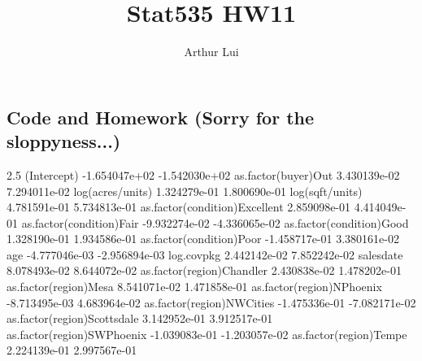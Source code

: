 \documentclass{article}
\begin{document}
\title{Stat535 HW11}
\author{Arthur Lui}
\maketitle

\subsection*{Code and Homework (Sorry for the sloppyness...)}

\begin{center}
\begin{Schunk}
\begin{Soutput}
                                      2.5 %        97.5 %
(Intercept)                   -1.654047e+02 -1.542030e+02
as.factor(buyer)Out            3.430139e-02  7.294011e-02
log(acres/units)               1.324279e-01  1.800690e-01
log(sqft/units)                4.781591e-01  5.734813e-01
as.factor(condition)Excellent  2.859098e-01  4.414049e-01
as.factor(condition)Fair      -9.932274e-02 -4.336065e-02
as.factor(condition)Good       1.328190e-01  1.934586e-01
as.factor(condition)Poor      -1.458717e-01  3.380161e-02
age                           -4.777046e-03 -2.956894e-03
log.covpkg                     2.442142e-02  7.852242e-02
salesdate                      8.078493e-02  8.644072e-02
as.factor(region)Chandler      2.430838e-02  1.478202e-01
as.factor(region)Mesa          8.541071e-02  1.471858e-01
as.factor(region)NPhoenix     -8.713495e-03  4.683964e-02
as.factor(region)NWCities     -1.475336e-01 -7.082171e-02
as.factor(region)Scottsdale    3.142952e-01  3.912517e-01
as.factor(region)SWPhoenix    -1.039083e-01 -1.203057e-02
as.factor(region)Tempe         2.224139e-01  2.997567e-01

\end{Soutput}
\end{Schunk}
\end{center}
\end{document}
